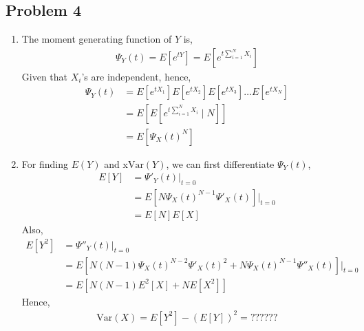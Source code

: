 \documentclass{article}
\begin{document}
	\subsection*{Problem 4}
		\begin{enumerate}
			\item The moment generating function of $Y$ is,
				\begin{align*}
					\Psi_{Y}(t) = E[e^{tY}] = E[e^{t \sum_{i=1}^{N}X_{i}}]
				\end{align*}
				Given that $X_{i}$'s are independent, hence,
				\begin{align*}
					\Psi_{Y}(t) &= E[e^{tX_{1}}]E[e^{tX_{2}}]E[e^{tX_{3}}] \ldots E[e^{tX_{N}}] \\
					&= E[E[e^{t \sum_{i=1}^{N}X_{i}} \mid N]] \\
					&= E[\Psi_{X}(t)^N]
				\end{align*}
			\item For finding $E(Y)$ and x$\mathrm{Var}(Y)$, we can first differentiate $\Psi_{Y}(t)$,
				\begin{align*}
					E[Y] &= \Psi'_{Y}(t) \bigg|_{t=0} \\
					&= E[N \Psi_{X}(t)^{N-1} \Psi'_{X}(t)] \bigg|_{t=0} \\
					&= E[N]E[X]
				\end{align*}
				Also,
				\begin{align*}
					E[Y^2] &= \Psi''_{Y}(t) \bigg|_{t=0} \\
					&= E[N(N-1)\Psi_{X}(t)^{N-2} \Psi'_{X}(t)^2 + N \Psi_{X}(t)^{N-1} \Psi''_{X}(t)] \bigg|_{t=0} \\
					&= E[N(N-1)E^2[X] + NE[X^2]]
				\end{align*}
				Hence,
				\begin{align*}
					\mathrm{Var}(X) = E[Y^2] - (E[Y])^2 = ??????
				\end{align*}
		\end{enumerate}
\end{document}
